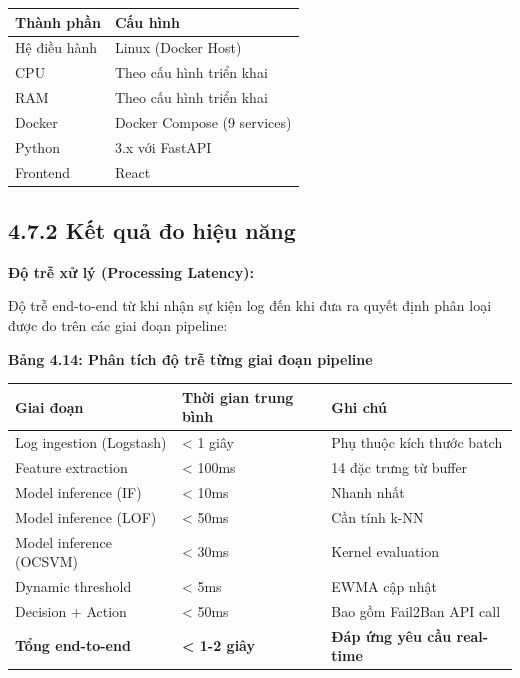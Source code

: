 \documentclass[
  a4paper]{report}
\newcounter{none} %
\begin{document}
{\def\LTcaptype{none} %
\begin{longtable}[]{@{}ll@{}}
\toprule\noalign{}
Thành phần & Cấu hình \\
\midrule\noalign{}
\endhead
\bottomrule\noalign{}
\endlastfoot
Hệ điều hành & Linux (Docker Host) \\
CPU & Theo cấu hình triển khai \\
RAM & Theo cấu hình triển khai \\
Docker & Docker Compose (9 services) \\
Python & 3.x với FastAPI \\
Frontend & React \\
\end{longtable}
}

\subsection{4.7.2 Kết quả đo hiệu
năng}\label{kux1ebft-quux1ea3-ux111o-hiux1ec7u-nux103ng}

\textbf{Độ trễ xử lý (Processing Latency):}

Độ trễ end-to-end từ khi nhận sự kiện log đến khi đưa ra quyết định phân
loại được đo trên các giai đoạn pipeline:

\textbf{Bảng 4.14: Phân tích độ trễ từng giai đoạn pipeline}

{\def\LTcaptype{none} %
\begin{longtable}[]{@{}lll@{}}
\toprule\noalign{}
Giai đoạn & Thời gian trung bình & Ghi chú \\
\midrule\noalign{}
\endhead
\bottomrule\noalign{}
\endlastfoot
Log ingestion (Logstash) & \textless{} 1 giây & Phụ thuộc kích thước
batch \\
Feature extraction & \textless{} 100ms & 14 đặc trưng từ buffer \\
Model inference (IF) & \textless{} 10ms & Nhanh nhất \\
Model inference (LOF) & \textless{} 50ms & Cần tính k-NN \\
Model inference (OCSVM) & \textless{} 30ms & Kernel evaluation \\
Dynamic threshold & \textless{} 5ms & EWMA cập nhật \\
Decision + Action & \textless{} 50ms & Bao gồm Fail2Ban API call \\
\textbf{Tổng end-to-end} & \textbf{\textless{} 1-2 giây} & \textbf{Đáp
ứng yêu cầu real-time} \\
\end{longtable}
}
\end{document}
